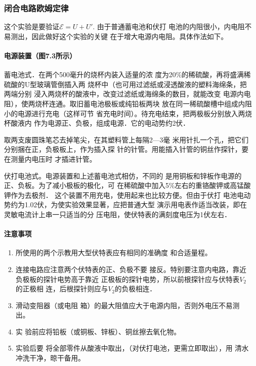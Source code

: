 \subsubsection{闭合电路欧姆定律}
这个实验是要验证$\mathcal{E}=U+U'$. 由于普通蓄电池和伏打
电池的内阻很小，内电阻不易测出，因此做好这个实验的关键
在于增大电源内电阻。具体作法如下。

\paragraph{电源装置（图7.3所示）}

蓄电池式．在两个500毫升的烧杯内装入适量的浓
度为20\%的稀硫酸，再将盛满稀硫酸的U型玻璃管倒插入两
烧杯中（也可用过滤纸或浸透酸液的塑料海绵条，把两端分别
浸入两烧杯的酸液中，改变过滤纸或海绵条的数目，就能改变
电源内电阻），使两烧杯连通。取旧蓄电池极板或纯铅板两块
放在同一稀硫酸槽中组成内阻小的电源进行充电（这样可节
省充电时间）。待充电结束，把两极板分别放入两烧杯酸液内
作为电源正、负极，组成电源．它的电动势约2伏．

取两支废圆珠笔芯去掉笔尖，在其塑料管上每隔2—3毫
米用针扎一个孔，把它们分别捆在正，负极板上，作为插入探
针的针管。用能插入针管的铜丝作探针，要在测量内电压时
才插进针管。

伏打电池式。电源装置和上述蓄电池式相仿，不同的
是用铜板和锌板作电源的正、负板。为了减小极板的极化，可
在稀硫酸中加入5\%左右的重铬酸钾或高锰酸钾作为去极剂．
这个装置不用充电，使用起来也比较方便。但由于伏打
电池电动势约为1.02伏，为使实验效果显著，应把普通大型
演示用电表作适当改装，即在灵敏电流计上串一只适当的分
压电阻，使伏特表的满刻度电压为1伏左右．

\paragraph{注意事项}
\begin{enumerate}
    \item 所使用的两个示教用大型伏特表应有相同的准确度
和合适量程。
\item 连接电路应注意两个伏特表的正、负极不要
接反。特别要注意内电路，靠近负极板的探针电势高于靠近
正极板的探针电势，所以前根探针应与伏特表$V_2$的正极相
连，后根探针则应与$V_2$的负极相连．
\item 滑动变阻器（或电阻
箱）的最大阻值应大于电源内阻，否则外电压不易测出。
\item 实
验前应将铅板（或铜板、锌板）、铜丝擦去氧化物。
\item 实验后要
将全部零件从酸液中取出，（对伏打电池，更需立即取出），用
清水冲洗干净，晾干备用。
\end{enumerate}

